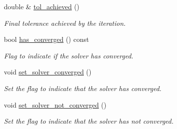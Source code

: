 \begin{DoxyCompactItemize}
double \& \hyperlink{classoomph_1_1PicardConvergenceData_a2e7b01bbd823fc1fd4feafb30fe31b42}{tol\+\_\+achieved} ()
\begin{DoxyCompactList}\small\item\em Final tolerance achieved by the iteration. \end{DoxyCompactList}\item 
bool \hyperlink{classoomph_1_1PicardConvergenceData_aa575a19693f4f00f2981e418d2176310}{has\+\_\+converged} () const
\begin{DoxyCompactList}\small\item\em Flag to indicate if the solver has converged. \end{DoxyCompactList}\item 
void \hyperlink{classoomph_1_1PicardConvergenceData_a181a6b365fb045cd70e30f193542d087}{set\+\_\+solver\+\_\+converged} ()
\begin{DoxyCompactList}\small\item\em Set the flag to indicate that the solver has converged. \end{DoxyCompactList}\item 
void \hyperlink{classoomph_1_1PicardConvergenceData_a1fcaf97b61a9afa18b569a8ca43b1454}{set\+\_\+solver\+\_\+not\+\_\+converged} ()
\begin{DoxyCompactList}\small\item\em Set the flag to indicate that the solver has not converged. \end{DoxyCompactList}\end{DoxyCompactItemize}
